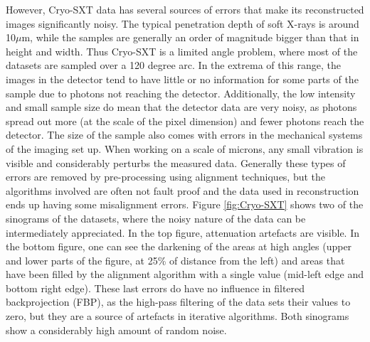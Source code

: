 However, Cryo-SXT data has several sources of errors that make its reconstructed images significantly noisy. The typical penetration depth of soft X-rays is around 10$\mu$m, while the samples are generally an order of magnitude bigger than that in height and width. Thus Cryo-SXT is a limited angle problem, where most of the datasets are sampled over a 120 degree arc. In the extrema of this range, the images in the detector tend to have little or no information for some parts of the sample due to photons not reaching the detector. Additionally, the low intensity and small sample size do mean that the detector data are very noisy, as photons spread out more (at the scale of the pixel dimension) and fewer photons reach the detector. The size of the sample also comes with errors in the mechanical systems of the imaging set up. When working on a scale of microns, any small vibration is visible and considerably perturbs the measured data. Generally these types of errors are removed by pre-processing using alignment techniques, but the algorithms involved are often not fault proof and the data used in reconstruction ends up having some misalignment errors. Figure \ref{fig:Cryo-SXT} shows two of the sinograms of the datasets, where the noisy nature of the data can be intermediately appreciated. In the top figure, attenuation artefacts are visible. In the bottom figure, one can see the darkening of the areas at high angles (upper and lower parts of the figure, at 25\% of distance from the left) and areas that have been filled by the alignment algorithm with a single value (mid-left edge and bottom right edge). These last errors do have no influence in filtered backprojection (FBP), as the high-pass filtering of the data sets their values to zero, but they are a source of artefacts in iterative algorithms. Both sinograms show a considerably high amount of random noise.

